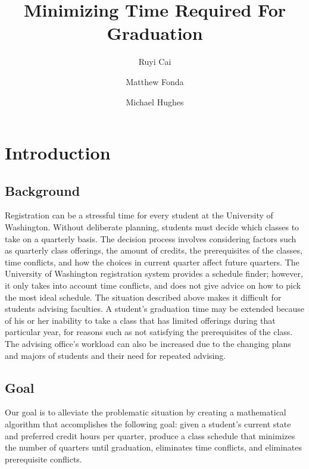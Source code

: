 \documentclass[11pt]{article} %
\title{Minimizing Time Required For Graduation}
\author{Ruyi Cai \and Matthew Fonda \and Michael Hughes}
\begin{document}
\maketitle

\tableofcontents
\pagebreak




\section{Introduction} \subsection{Background} Registration can be a stressful
time for every student at the University of Washington. Without deliberate
planning, students must decide which classes to take on a quarterly basis. The
decision process involves considering factors such as quarterly class
offerings, the amount of credits, the prerequisites of the classes, time
conflicts, and how the choices in current quarter affect future quarters. The
University of Washington registration system provides a schedule finder;
however, it only takes into account time conflicts, and does not give advice on
how to pick the most ideal schedule. The situation described above makes it
difficult for students advising faculties. A student's graduation time may be
extended because of his or her inability to take a class that has limited
offerings during that particular year, for reasons such as not satisfying the
prerequisites of the class. The advising office’s workload can also be increased
due to the changing plans and majors of students and their need for repeated
advising. 

\subsection{Goal} Our goal is to alleviate the problematic situation by creating
a mathematical algorithm that accomplishes the following goal: given a student's
current state and preferred credit hours per quarter, produce a class schedule
that minimizes the number of quarters until graduation, eliminates time
conflicts, and eliminates prerequisite conflicts. 
\end{document}
